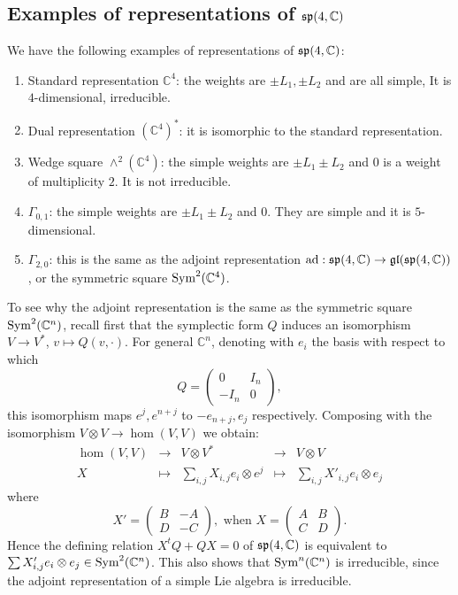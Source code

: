 \documentclass{report}
\begin{document}
\subsection{Examples of representations of $\operatorname{{\mathfrak{sp}}}(4, \mathbb C)$}
We have the following examples of representations of $\operatorname{{\mathfrak{sp}}}(4, \mathbb C)$:
\begin{enumerate}
    \item Standard representation $\mathbb C^4$: the weights are $\pm L_1, \pm L_2$ and are all simple, It is $4$-dimensional, irreducible.
    \item Dual representation $(\mathbb C^4)^*$: it is isomorphic to the standard representation.
    \item Wedge square $\wedge^2(\mathbb C^4)$: the simple weights are $\pm L_1 \pm L_2$ and $0$ is a weight of multiplicity $2$.
    It is not irreducible.
    \item $\Gamma_{0,1}$: the simple weights are $\pm L_1 \pm L_2$ and $0$. They are simple and it is $5$-dimensional.
    \item $\Gamma_{2,0}$: this is the same as the adjoint representation $\operatorname{ad}: \operatorname{{\mathfrak{sp}}}(4, \mathbb C) \to \operatorname{{\mathfrak{gl}}}(\operatorname{{\mathfrak{sp}}}(4,\mathbb C))$, or the symmetric square $\operatorname{Sym}^2(\mathbb C^4)$.
\end{enumerate}

\begin{remark}
    To see why the adjoint representation is the same as the symmetric square $\operatorname{Sym}^2(\mathbb C^n)$, recall first that the symplectic form $Q$ induces an isomorphism $V \to V^*$, $v \mapsto Q(v, \cdot)$.
    For general $\mathbb C^n$, denoting with $e_i$ the basis with respect to which
    \[
    Q = \begin{pmatrix}
        0 & I_n\\
        -I_n & 0
    \end{pmatrix},
    \]
    this isomorphism maps $e^j, e^{n+j}$ to $-e_{n+j}, e_j$ respectively.
    Composing with the isomorphism $V \otimes V \to \hom(V, V)$ we obtain:
    \[
    \begin{array}{rcccl}
        \hom(V,V)   &\to &V \otimes V^* &\to &V \otimes V\\
        X &\mapsto &\sum_{i,j} X_{i,j}e_i \otimes e^j &\mapsto &\sum_{i,j} X'_{i,j}e_i \otimes e_j
    \end{array}
    \]
    where
    \[
    X'= \begin{pmatrix}
        B & -A\\
        D & -C
    \end{pmatrix}, \text{ when } X = \begin{pmatrix}
        A & B\\
        C & D
    \end{pmatrix}.
    \]
    Hence the defining relation $X^t Q + Q X = 0$ of $\operatorname{{\mathfrak{sp}}}(4, \mathbb C)$ is equivalent to $\sum X'_{i,j}e_i \otimes e_j \in \operatorname{Sym}^2(\mathbb C^n)$.
    This also shows that $\operatorname{Sym}^n(\mathbb C^n)$ is irreducible, since the adjoint representation of a simple Lie algebra is irreducible.
\end{remark}
\end{document}

